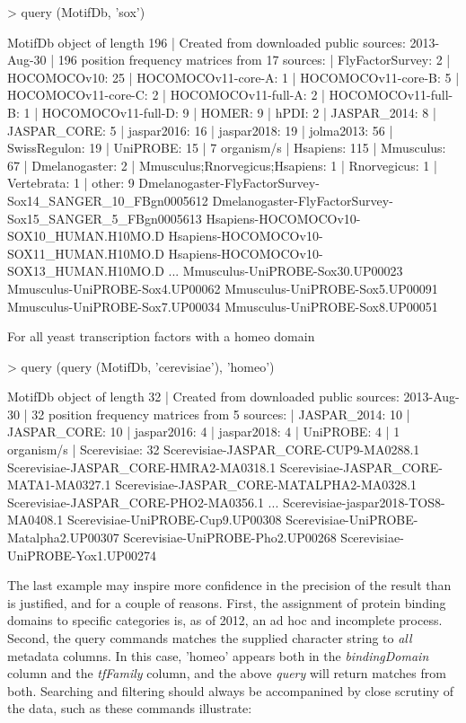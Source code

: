 \documentclass{article}
\renewenvironment{Schunk}{\vspace{\topsep}}{\vspace{\topsep}}
\begin{document}
\begin{Schunk}
\begin{Sinput}
> query (MotifDb, 'sox')
\end{Sinput}
\begin{Soutput}
MotifDb object of length 196
| Created from downloaded public sources: 2013-Aug-30
| 196 position frequency matrices from 17 sources:
|    FlyFactorSurvey:    2
|        HOCOMOCOv10:   25
| HOCOMOCOv11-core-A:    1
| HOCOMOCOv11-core-B:    5
| HOCOMOCOv11-core-C:    2
| HOCOMOCOv11-full-A:    2
| HOCOMOCOv11-full-B:    1
| HOCOMOCOv11-full-D:    9
|              HOMER:    9
|               hPDI:    2
|        JASPAR_2014:    8
|        JASPAR_CORE:    5
|         jaspar2016:   16
|         jaspar2018:   19
|          jolma2013:   56
|       SwissRegulon:   19
|           UniPROBE:   15
| 7 organism/s
|           Hsapiens:  115
|          Mmusculus:   67
|      Dmelanogaster:    2
| Mmusculus;Rnorvegicus;Hsapiens:    1
|        Rnorvegicus:    1
|         Vertebrata:    1
|              other:    9
Dmelanogaster-FlyFactorSurvey-Sox14_SANGER_10_FBgn0005612 
Dmelanogaster-FlyFactorSurvey-Sox15_SANGER_5_FBgn0005613 
Hsapiens-HOCOMOCOv10-SOX10_HUMAN.H10MO.D 
Hsapiens-HOCOMOCOv10-SOX11_HUMAN.H10MO.D 
Hsapiens-HOCOMOCOv10-SOX13_HUMAN.H10MO.D 
...
Mmusculus-UniPROBE-Sox30.UP00023 
Mmusculus-UniPROBE-Sox4.UP00062 
Mmusculus-UniPROBE-Sox5.UP00091 
Mmusculus-UniPROBE-Sox7.UP00034 
Mmusculus-UniPROBE-Sox8.UP00051 
\end{Soutput}
\end{Schunk}
For all yeast transcription factors with a homeo domain
\begin{Schunk}
\begin{Sinput}
> query (query (MotifDb, 'cerevisiae'), 'homeo')
\end{Sinput}
\begin{Soutput}
MotifDb object of length 32
| Created from downloaded public sources: 2013-Aug-30
| 32 position frequency matrices from 5 sources:
|        JASPAR_2014:   10
|        JASPAR_CORE:   10
|         jaspar2016:    4
|         jaspar2018:    4
|           UniPROBE:    4
| 1 organism/s
|        Scerevisiae:   32
Scerevisiae-JASPAR_CORE-CUP9-MA0288.1 
Scerevisiae-JASPAR_CORE-HMRA2-MA0318.1 
Scerevisiae-JASPAR_CORE-MATA1-MA0327.1 
Scerevisiae-JASPAR_CORE-MATALPHA2-MA0328.1 
Scerevisiae-JASPAR_CORE-PHO2-MA0356.1 
...
Scerevisiae-jaspar2018-TOS8-MA0408.1 
Scerevisiae-UniPROBE-Cup9.UP00308 
Scerevisiae-UniPROBE-Matalpha2.UP00307 
Scerevisiae-UniPROBE-Pho2.UP00268 
Scerevisiae-UniPROBE-Yox1.UP00274 
\end{Soutput}
\end{Schunk}
The last example may inspire more confidence in the precision of the result than is justified, and for a couple
of reasons.  First, the assignment of  protein binding domains to specific categories is, as of 2012, an ad hoc
and incomplete process.  Second, the query commands matches the supplied character string to \emph{all} metadata
columns.  In this case, 'homeo' appears both in the \emph{bindingDomain} column and the \emph{tfFamily} column,
and the above \emph{query} will return matches from both.
Searching and filtering should always be accompanined by close scrutiny of the data, such as these commands
illustrate:
\end{document}
